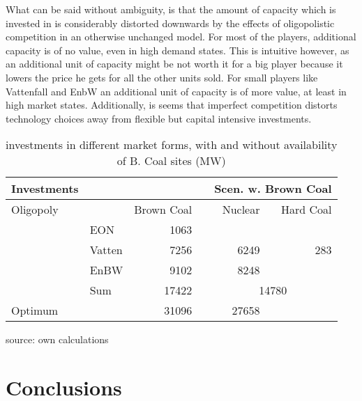 What can be said without ambiguity, is that the amount of capacity which is invested in is considerably distorted downwards by the effects of oligopolistic competition in an otherwise unchanged model. For most of the players, additional capacity is of no value, even in high demand states. This is intuitive however, as an additional unit of capacity might be not worth it for a big player because it lowers the price he gets for all the other units sold. For small players like Vattenfall and EnbW an additional unit of capacity is of more value, at least in high market states. Additionally, is seems that imperfect competition distorts technology choices away from flexible but capital intensive investments.

\begin{table}
\centering

\begin{tabular}{llrrrr}
\hline
\hline
Investments &            &            &            & \multicolumn{ 2}{r}{Scen. w. Brown Coal} \\
\hline
 Oligopoly &            & Brown Coal &            &    Nuclear &  Hard Coal \\
\hline
           &        EON &       1063 &            &            &            \\

           &     Vatten &       7256 &            &       6249 &        283 \\

           &       EnBW &       9102 &            &       8248 &            \\

           &        Sum &      17422 &            & \multicolumn{ 2}{c}{14780} \\
\hline
   Optimum &            &      31096 &            &      27658 &            \\
\hline
\hline
\end{tabular}  


\label{tab:invest}
\caption{investments in different market forms, with and without availability of B. Coal sites (MW)}
\begin{center}
source: own calculations
\end{center}
\end{table}

\section{Conclusions}

